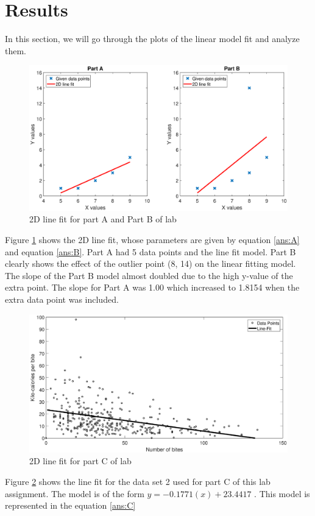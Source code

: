 \documentclass[12pt]{article}
\begin{document}
\section{Results}
In this section, we will go through the plots of the linear model fit and analyze them. \\
\begin{figure}[h]
\centering
	\includegraphics[scale=0.3]{resA}
	\caption{2D line fit for part A and Part B of lab}
	\label{res:1}
\end{figure}

\noindent
Figure \ref{res:1} shows the 2D line fit, whose parameters are given by equation \ref{ans:A} and equation \ref{ans:B}. Part A had 5 data points and the line fit model. Part B clearly shows the effect of the outlier point (8, 14) on the linear fitting model. The slope of the Part B model almost doubled due to the high y-value of the extra point. The slope for Part A was 1.00 which increased to 1.8154 when the extra data point was included.\\

\begin{figure}[h]
\centering
	\includegraphics[scale=0.32]{resCline}
	\caption{2D line fit for part C of lab}
	\label{res:2}
\end{figure}
\noindent
Figure \ref{res:2} shows the line fit for the data set 2 used for part C of this lab assignment. The model is of the form $y = -0.1771(x) + 23.4417$ . This model is represented in the equation \ref{ans:C}  \\
\end{document}
